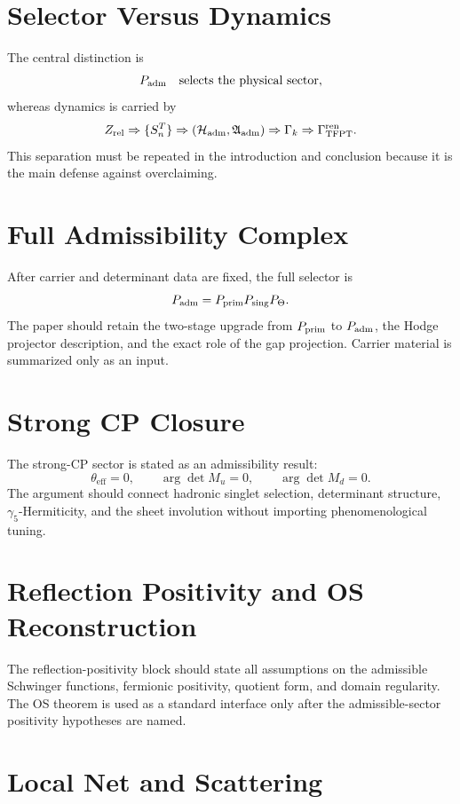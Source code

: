 \documentclass[11pt,a4paper]{article}
\begin{document}
\section{Selector Versus Dynamics}

The central distinction is
\[
P_{\mathrm{adm}}\quad\text{selects the physical sector},
\]
whereas dynamics is carried by
\[
Z_{\mathrm{rel}}
\Rightarrow
\{S_n^T\}
\Rightarrow
(\mathcal H_{\mathrm{adm}},\mathfrak A_{\mathrm{adm}})
\Rightarrow
\Gamma_k
\Rightarrow
\Gamma_{\mathrm{TFPT}}^{\mathrm{ren}} .
\]
This separation must be repeated in the introduction and conclusion because it is the main defense
against overclaiming.

\section{Full Admissibility Complex}

After carrier and determinant data are fixed, the full selector is
\[
P_{\mathrm{adm}}=P_{\mathrm{prim}} P_{\mathrm{sing}}P_\Theta.
\]
The paper should retain the two-stage upgrade from $P_{\mathrm{prim}}$ to $P_{\mathrm{adm}}$, the Hodge projector
description, and the exact role of the gap projection. Carrier material is summarized only as an
input.

\section{Strong CP Closure}

The strong-CP sector is stated as an admissibility result:
\[
\theta_{\mathrm{eff}}=0,
\qquad
\operatorname{arg}\det M_u=0,
\qquad
\operatorname{arg}\det M_d=0.
\]
The argument should connect hadronic singlet selection, determinant structure,
$\gamma_5$-Hermiticity, and the sheet involution without importing phenomenological tuning.

\section{Reflection Positivity and OS Reconstruction}

The reflection-positivity block should state all assumptions on the admissible Schwinger functions,
fermionic positivity, quotient form, and domain regularity. The OS theorem is used as a standard
interface only after the admissible-sector positivity hypotheses are named.

\section{Local Net and Scattering}
\end{document}
